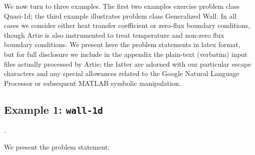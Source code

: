 \documentclass[preprint,12pt]{article}
\begin{document}
We now turn to three examples. The first two examples exercise problem class Quasi-1d; the third example illustrates problem class Generalized Wall. In all cases we consider either heat transfer coefficient or zero-flux boundary conditions, though Artie is also instrumented to treat temperature and non-zero flux boundary conditions.  We present here the problem statements in latex format, but for full disclosure we include in the appendix the plain-text (verbatim) input files actually processed by Artie; the latter are adorned with our particular escape characters and any special allowances related to the Google Natural Language Processor or subsequent MATLAB symbolic manipulation.


\subsection{Example 1: \texttt{wall-1d}}. 

We present the problem statement:
\end{document}
